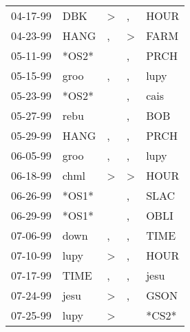 \begin{supertabular}{p{0.07\textwidth}p{0.06\textwidth}p{0.02\textwidth}p{0.02\textwidth}p{0.06\textwidth}}
 04-17-99\textsuperscript{} &   DBK\textsuperscript{} &     \textgreater &             , &           HOUR\textsuperscript{} \\
 04-23-99\textsuperscript{} &  HANG\textsuperscript{} &                , &  \textgreater &           FARM\textsuperscript{} \\
 05-11-99\textsuperscript{} &                   *OS2* &                  &             , &           PRCH\textsuperscript{} \\
 05-15-99\textsuperscript{} &  groo\textsuperscript{} &                , &             , &           lupy\textsuperscript{} \\
 05-23-99\textsuperscript{} &                   *OS2* &                  &             , &           cais\textsuperscript{} \\
 05-27-99\textsuperscript{} &  rebu\textsuperscript{} &                  &             , &            BOB\textsuperscript{} \\
 05-29-99\textsuperscript{} &  HANG\textsuperscript{} &                , &             , &           PRCH\textsuperscript{} \\
 06-05-99\textsuperscript{} &  groo\textsuperscript{} &                , &             , &           lupy\textsuperscript{} \\
 06-18-99\textsuperscript{} &  chml\textsuperscript{} &     \textgreater &  \textgreater &           HOUR\textsuperscript{} \\
 06-26-99\textsuperscript{} &                   *OS1* &                  &             , &           SLAC\textsuperscript{} \\
 06-29-99\textsuperscript{} &                   *OS1* &                  &             , &           OBLI\textsuperscript{} \\
 07-06-99\textsuperscript{} &  down\textsuperscript{} &                , &             , &           TIME\textsuperscript{} \\
 07-10-99\textsuperscript{} &  lupy\textsuperscript{} &     \textgreater &             , &           HOUR\textsuperscript{} \\
 07-17-99\textsuperscript{} &  TIME\textsuperscript{} &                , &             , &           jesu\textsuperscript{} \\
 07-24-99\textsuperscript{} &  jesu\textsuperscript{} &     \textgreater &             , &           GSON\textsuperscript{} \\
 07-25-99\textsuperscript{} &  lupy\textsuperscript{} &     \textgreater &               &                            *CS2* \\

\end{supertabular}
